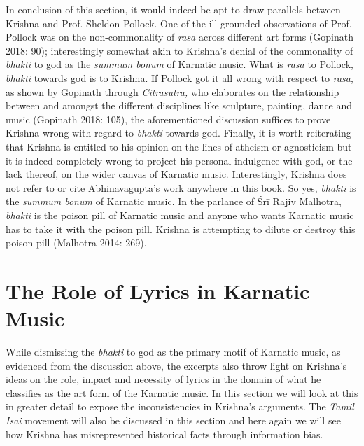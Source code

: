 In conclusion of this section, it would indeed be apt to draw parallels between Krishna and Prof. Sheldon Pollock. One of the ill-grounded observations of Prof. Pollock was on the non-commonality of \textit{rasa} across different art forms (Gopinath 2018: 90); interestingly somewhat akin to Krishna’s denial of the commonality of \textit{bhakti} to god as the \textit{summum bonum} of Karnatic music. What is \textit{rasa} to Pollock, \textit{bhakti} towards god is to Krishna. If Pollock got it all wrong with respect to \textit{rasa}, as shown by Gopinath through \textit{Citrasūtra,} who elaborates on the relationship between and amongst the different disciplines like sculpture, painting, dance and music (Gopinath 2018: 105), the aforementioned discussion suffices to prove Krishna wrong with regard to \textit{bhakti} towards god. Finally, it is worth reiterating that Krishna is entitled to his opinion on the lines of atheism or agnosticism but it is indeed completely wrong to project his personal indulgence with god, or the lack thereof, on the wider canvas of Karnatic music. Interestingly, Krishna does not refer to or cite Abhinavagupta’s work anywhere in this book. So yes, \textit{bhakti} is the \textit{summum bonum} of Karnatic music. In the parlance of Śrī Rajiv Malhotra, \textit{bhakti} is the poison pill of Karnatic music and anyone who wants Karnatic music has to take it with the poison pill. Krishna is attempting to dilute or destroy this poison pill (Malhotra 2014: 269).

\vspace{-.3cm}

\section*{The Role of Lyrics in Karnatic Music }

\vspace{-.2cm}

While dismissing the \textit{bhakti} to god as the primary motif of Karnatic music, as evidenced from the discussion above, the excerpts also throw light on Krishna’s ideas on the role, impact and necessity of lyrics in the domain of what he classifies as the art form of the Karnatic music. In this section we will look at this in greater detail to expose the inconsistencies in Krishna’s arguments. The \textit{Tamil Isai} movement will also be discussed in this section and here again we will see how Krishna has misrepresented historical facts through information bias.

